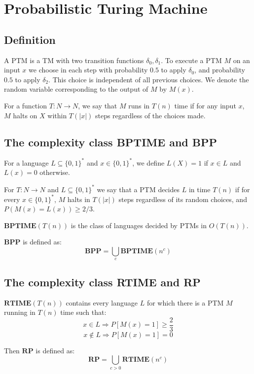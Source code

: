 \documentclass[12pt,letterpaper]{article}
\theoremstyle{definition}
\begin{document}
\section{Probabilistic Turing Machine}

\subsection{Definition}

A PTM is a TM with two transition functions $\delta_0, \delta_1$. To execute a PTM $M$ on an input $x$ we choose in each step with probability $0.5$ to apply $\delta_0$, and probability $0.5$ to apply $\delta_2$. This choice is independent of all previous choices. We denote the random variable corresponding to the output of $M$ by $M(x)$.

For a function $T:N \rightarrow N$, we say that $M$ runs in $T(n)$ time if for any input $x$, $M$ halts on $X$ within $T(|x|)$ steps regardless of the choices made.

\subsection{The complexity class BPTIME and BPP}

For a language $L \subseteq \{0,1\}^*$ and $x \in \{0,1\}^*$, we define $L(X) = 1$ if $x \in L$ and $L(x) = 0$ otherwise.

For $T : N \rightarrow N$ and $L \subseteq \{0,1\}^*$ we say that a PTM decides $L$ in time $T(n)$ if for every $x \in \{0,1\}^*$, $M$ halts in $T(|x|)$ steps regardless of its random choices, and $P(M(x) = L(x)) \geq 2/3$. 

$\mathbf{BPTIME}(T(n))$ is the class of languages decided by PTMs in $O(T(n))$.

$\mathbf{BPP}$ is defined as:
\[\mathbf{BPP} = \bigcup_{c} \mathbf{BPTIME}(n^c)\]

\subsection{The complexity class RTIME and RP}

$\mathbf{RTIME}(T(n))$ contains every language $L$ for which there is a PTM $M$ running in $T(n)$ time such that:
\[x \in L \Rightarrow P[M(x) = 1] \geq \frac{2}{3}\]
\[x \notin L \Rightarrow P[M(x) = 1] = 0\]

Then $\mathbf{RP}$ is defined as:
\[\mathbf{RP} = \bigcup_{c > 0} \mathbf{RTIME}(n^c)\]
\end{document}
